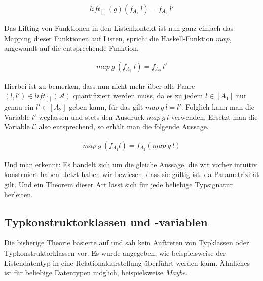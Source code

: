 \begin{align*}
lift_{[]}(g) (f_{A_1}\ l) = f_{A_2}\ l'
\end{align*}

Das Lifting von Funktionen in den Listenkontext ist nun ganz einfach das Mapping dieser Funktionen auf Listen, sprich: die Haskell-Funktion
$map$, angewandt auf die entsprechende Funktion.

\begin{align*}
map\ g\ (f_{A_1}\ l) = f_{A_2}\ l'
\end{align*}

Hierbei ist zu bemerken, dass nun nicht mehr über alle Paare $(l, l') \in lift_{[]}(\mathcal{A})$
quantifiziert werden muss, da es zu jedem $l \in [A_1]$ nur genau ein $l' \in [A_2]$ geben kann, für das gilt $map\ g\ l = l'$. Folglich kann man die Variable $l'$
weglassen und stets den Ausdruck $map\ g\ l$ verwenden.
Ersetzt man die Variable $l'$ also entsprechend, so erhält man die folgende Aussage.

\begin{align*}
map\ g\ (f_{A_1} l) = f_{A_2} (map\ g\ l)
\end{align*}

Und man erkennt: Es handelt sich um die gleiche Aussage, die wir vorher intuitiv konstruiert haben. Jetzt haben wir bewiesen,
dass sie gültig ist, da Parametrizität gilt. Und ein Theorem dieser Art lässt sich für jede beliebige Typsignatur herleiten.


\subsection{Typkonstruktorklassen und -variablen}

\label{sec:typkonstruktorklassen}

Die bisherige Theorie basierte auf \cite{wadler} und sah kein Auftreten von Typklassen oder Typkonstruktorklassen vor.
Es wurde angegeben, wie beispielsweise der Listendatentyp in eine Relationaldarstellung überführt werden kann. Ähnliches
ist für beliebige Datentypen möglich, beispielsweise $Maybe$.


